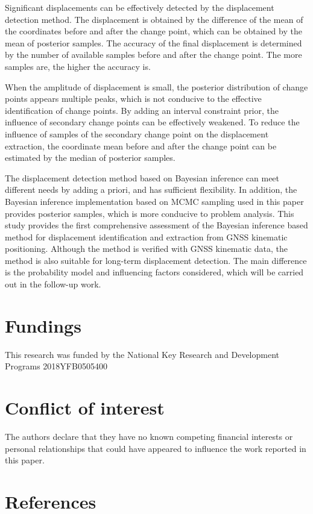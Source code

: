 \documentclass[final,3p,times]{elsarticle}
\begin{document}
	Significant displacements can be effectively detected by the displacement \textcolor{r_s}{detection method}.
	The displacement is obtained by the difference of the mean of the coordinates before and after the change point, which can be obtained by the mean of \textcolor{r_s}{posterior samples}.
	The accuracy of the final displacement is determined by the number of available samples before and after the change point.
	The more samples are, the higher the accuracy is.
	
	When the amplitude of displacement is small, the posterior distribution of change points appears multiple peaks, which is not conducive to the effective identification of change points.
	By adding an interval constraint prior, the influence of secondary change points can be effectively weakened.
	To reduce the influence of \textcolor{r_s}{samples} of the secondary change point on the displacement extraction, the coordinate mean before and after the change point can be estimated by the median of \textcolor{r_s}{posterior samples}.
	
	The displacement detection \textcolor{r_s}{method} based on Bayesian inference can meet different needs by adding a priori, and has sufficient flexibility.
	In addition, the Bayesian inference implementation based on MCMC sampling used in this paper provides posterior samples, which is more conducive to problem analysis.
	This study provides the first comprehensive assessment of the Bayesian inference \textcolor{r_s}{based method} for displacement identification and extraction from GNSS kinematic positioning.
	\textcolor{r_s}{
	Although the method is verified with GNSS kinematic data, the method is also suitable for long-term displacement detection. The main difference is the probability model and influencing factors considered, which will be carried out in the follow-up work.	
	}
	

	\section*{Fundings}
This research was funded by the National Key Research and Development Programs 2018YFB0505400
	\section*{Conflict of interest}
	The authors declare that they have no known competing financial interests or personal relationships that could have appeared to influence the work reported in this paper.
	\section*{References} 
	
	
\end{document}
